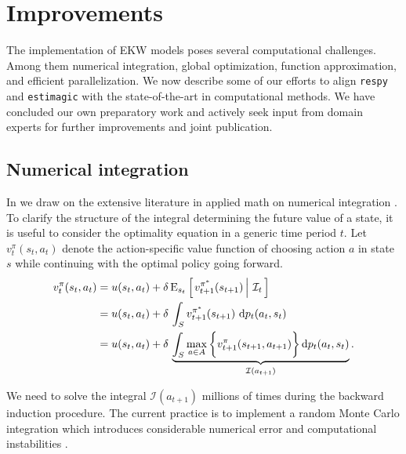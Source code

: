 \section{Improvements}\label{Computation}
The implementation of EKW models poses several computational challenges. Among them numerical integration, global optimization, function approximation, and efficient parallelization. We now describe some of our efforts to align \verb+respy+ and \verb+estimagic+ with the state-of-the-art in computational methods. We have concluded our own preparatory work and actively seek input from domain experts for further improvements and joint publication.
\subsection{Numerical integration}
In \citet{Gabler.2020a} we draw on the extensive literature in applied math on numerical integration \citep{Davis.2007,Gerstner.1998}.\\

\noindent To clarify the structure of the integral determining the future value of a state, it is useful to consider the optimality equation in a generic time period $t$. Let $v^{\pi}_{t}(s_t, a_t)$ denote the action-specific value function of choosing action $a$ in state $s$ while continuing with the optimal policy going forward.
%
\begin{align*}
v^{\pi}_{t}(s_t, a_t) & = u(s_t, a_t) + \delta\,\mathrm{E}_{s_t} \left[\left.v^{\pi^*}_{t + 1}(s_{t + 1})\,\right\vert\,\mathcal{I}_t\,\right] \\
& =  u(s_t, a_t) + \delta\, \int_S v^{\pi^*}_{t + 1}(s_{t + 1})\, \mathop{}\!\mathrm{d} p_t(a_t, s_t)\\
& =  u(s_t, a_t) + \delta\, \underbrace{\int_S \max_{a \in A}\bigg\{v^\pi_{t + 1}(s_{t + 1}, a_{t + 1})\bigg\}\mathop{}\!\mathrm{d} p_t(a_t, s_t)}_{\mathcal{I}(a_{t + 1})}.
\end{align*}

\noindent We need to solve the integral $\mathcal{I}(a_{t + 1})$ millions of times during the backward induction procedure. The current practice is to implement a random Monte Carlo integration which introduces considerable numerical error and computational instabilities \citep{Judd.2011}.\\

